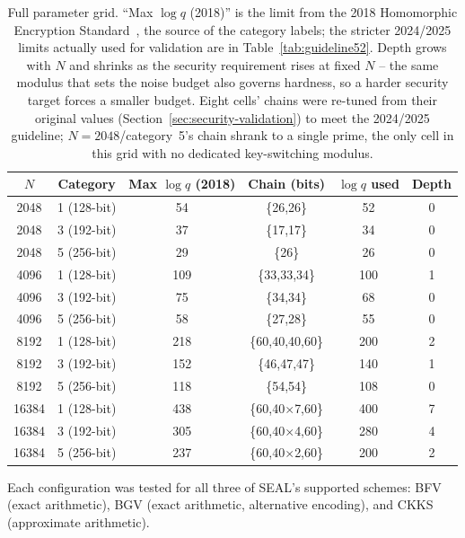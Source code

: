 \begin{table}[h!]
\centering\small
\begin{tabular}{@{}cccccc@{}}
\toprule
$N$ & Category & Max $\log q$ (2018) & Chain (bits) & $\log q$ used & Depth \\
\midrule
2048  & 1 (128-bit) & 54  & \{26,26\}             & 52  & 0 \\
2048  & 3 (192-bit) & 37  & \{17,17\}             & 34  & 0 \\
2048  & 5 (256-bit) & 29  & \{26\}                & 26  & 0 \\
4096  & 1 (128-bit) & 109 & \{33,33,34\}          & 100 & 1 \\
4096  & 3 (192-bit) & 75  & \{34,34\}             & 68  & 0 \\
4096  & 5 (256-bit) & 58  & \{27,28\}             & 55  & 0 \\
8192  & 1 (128-bit) & 218 & \{60,40,40,60\}       & 200 & 2 \\
8192  & 3 (192-bit) & 152 & \{46,47,47\}          & 140 & 1 \\
8192  & 5 (256-bit) & 118 & \{54,54\}             & 108 & 0 \\
16384 & 1 (128-bit) & 438 & \{60,40$\times$7,60\} & 400 & 7 \\
16384 & 3 (192-bit) & 305 & \{60,40$\times$4,60\} & 280 & 4 \\
16384 & 5 (256-bit) & 237 & \{60,40$\times$2,60\} & 200 & 2 \\
\bottomrule
\end{tabular}
\caption{Full parameter grid. ``Max $\log q$ (2018)'' is the limit from the 2018 Homomorphic Encryption Standard~\cite{hestandard2021}, the source of the category labels; the stricter 2024/2025 limits actually used for validation are in Table~\ref{tab:guideline52}. Depth grows with $N$ and shrinks as the security requirement rises at fixed $N$ -- the same modulus that sets the noise budget also governs hardness, so a harder security target forces a smaller budget. Eight cells' chains were re-tuned from their original values (Section~\ref{sec:security-validation}) to meet the 2024/2025 guideline; $N{=}2048$/category~5's chain shrank to a single prime, the only cell in this grid with no dedicated key-switching modulus.}
\label{tab:paramgrid}
\end{table}

Each configuration was tested for all three of SEAL's supported schemes: BFV (exact arithmetic), BGV (exact arithmetic, alternative encoding), and CKKS (approximate arithmetic).

